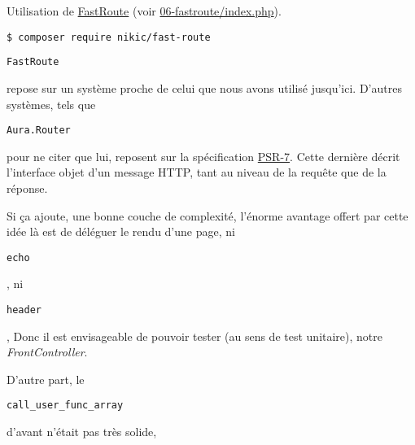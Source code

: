 Utilisation de \href{https://github.com/nikic/FastRoute}{FastRoute}
(voir
\href{https://github.com/HE-Arc/php-intro-framework/blob/master/06-fastroute/index.php}{06-fastroute/index.php}).

\begin{otherlanguage}{english}

\begin{verbatim}
$ composer require nikic/fast-route
\end{verbatim}

\end{otherlanguage}

\begin{otherlanguage}{english}\texttt{FastRoute}\end{otherlanguage}
repose sur un système proche de celui que nous avons utilisé jusqu'ici.
D'autres systèmes, tels que
\begin{otherlanguage}{english}\texttt{Aura.Router}\end{otherlanguage}
pour ne citer que lui, reposent sur la spécification
\href{http://www.php-fig.org/psr/psr-7/}{PSR-7}. Cette dernière décrit
l'interface objet d'un message HTTP, tant au niveau de la requête que de
la réponse.

Si ça ajoute, une bonne couche de complexité, l'énorme avantage offert
par cette idée là est de déléguer le rendu d'une page, ni
\begin{otherlanguage}{english}\texttt{echo}\end{otherlanguage}, ni
\begin{otherlanguage}{english}\texttt{header}\end{otherlanguage}, Donc
il est envisageable de pouvoir tester (au sens de test unitaire), notre
\emph{FrontController}.

D'autre part, le
\begin{otherlanguage}{english}\texttt{call\_user\_func\_array}\end{otherlanguage}
d'avant n'était pas très solide,

